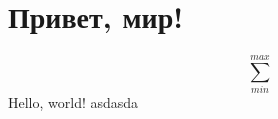\newcommand{\CourseName}{Введение в математический анализ}
\newcommand{\FullCourseNameFirstPart}{\so{ВВЕДЕНИЕ В МАТЕМАТИЧЕСКИЙ АНАЛИЗ}}
\newcommand{\SemesterNumber}{II}
\newcommand{\LecturerInitials}{Вадим Владимирович Редкозубов}
\newcommand{\CourseDate}{весна 2025}
\newcommand{\AuthorInitials}{Киселев Николай}
\newcommand{\VKLink}{https://vk.com/id1}
\newcommand{\GithubLink}{https://github.com/daniild71r/lectures_tex_club}

\section{Привет, мир!}
$$\sum_{min}^{max}$$
Hello, world!
asdasda
